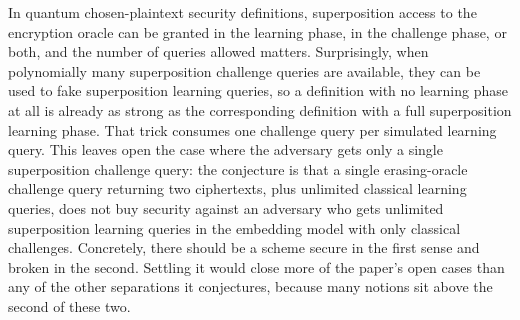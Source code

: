 \documentclass{conjura-conjecture}
\begin{document}

\vspace{0.4em}

\begin{informalconjecture}
In quantum chosen-plaintext security definitions, superposition access
to the encryption oracle can be granted in the learning phase, in the
challenge phase, or both, and the number of queries allowed matters.
Surprisingly, when polynomially many superposition challenge queries are
available, they can be used to fake superposition learning queries, so a
definition with no learning phase at all is already as strong as the
corresponding definition with a full superposition learning phase. That
trick consumes one challenge query per simulated learning query. This
leaves open the case where the adversary gets only a single
superposition challenge query: the conjecture is that a single
erasing-oracle challenge query returning two ciphertexts, plus unlimited
classical learning queries, does not buy security against an adversary
who gets unlimited superposition learning queries in the embedding model
with only classical challenges. Concretely, there should be a scheme
secure in the first sense and broken in the second. Settling it would
close more of the paper's open cases than any of the other separations
it conjectures, because many notions sit above the second of these two.
\end{informalconjecture}
\end{document}
